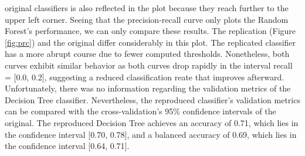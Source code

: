 original classifiers is also reflected in the plot because they reach further 
to the upper left corner. Seeing that the precision-recall curve only plots the 
Random Forest's performance, we can only compare these results. The replication 
(Figure \ref{fig:prc}) and the original differ considerably in this plot. The 
replicated classifier has a more abrupt course due to fewer 
computed thresholds. Nonetheless, both curves exhibit similar behavior as both 
curves drop rapidly in the interval recall = [0.0, 0.2], suggesting a reduced 
classification reate that improves afterward. Unfortunately, there was no 
information regarding the validation metrics of the Decision Tree classifier. 
Nevertheless,  the reproduced classifier's validation metrics can be compared 
with the cross-validation's 95\% confidence intervals of the original. The 
reproduced Decision Tree achieves an accuracy of 0.71, which lies in the 
confidence interval [0.70, 0.78], and a balanced accuracy of 0.69, which lies 
in the confidence interval [0.64, 0.71].
